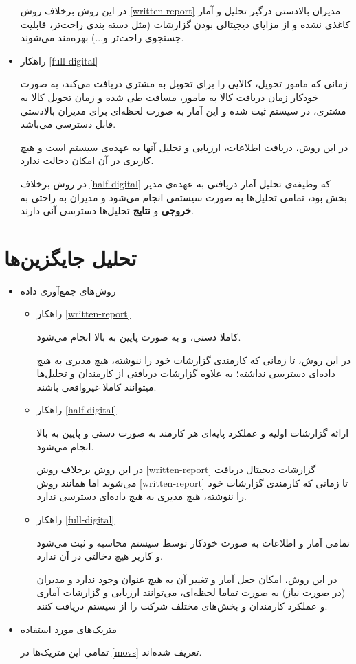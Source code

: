 \documentclass[12pt]{article}
\begin{document}
\begin{itemize}
    در این روش برخلاف روش \ref{written-report} مدیران بالادستی درگیر تحلیل و آمار کاغذی نشده و از مزایای دیجیتالی بودن گزارشات (مثل دسته بندی راحت‌تر، قابلیت جستجو‌ی راحت‌تر و...) بهره‌مند می‌شوند.
    \item راهکار \ref{full-digital}
    
    زمانی که مامور تحویل، کالایی را برای تحویل به مشتری دریافت می‌کند، به صورت خودکار زمان دریافت کالا به مامور، مسافت طی شده و زمان تحویل کالا به مشتری، در سیستم ثبت شده و این آمار به صورت لحظه‌‌ای برای مدیران بالادستی قابل دسترسی می‌باشد.
    
    در این روش، دریافت اطلاعات، ارزیابی و تحلیل آنها به عهده‌ی سیستم است و هیچ کاربری در آن امکان دخالت ندارد. 
    
    در روش برخلاف \ref{half-digital} که وظیفه‌ی تحلیل آمار دریافتی به عهده‌ی مدیر بخش بود، تمامی تحلیل‌ها به صورت سیستمی انجام می‌شود و مدیران به راحتی به \textbf{خروجی} و \textbf{نتایج} تحلیل‌ها دسترسی آنی دارند.
    
\end{itemize}

\section{تحلیل جایگزین‌ها}


\begin{itemize}
\item         
روش‌های جمع‌آوری داده

\begin{itemize}
    \item راهکار \ref{written-report} 
    
    کاملا دستی، و به صورت پایین به بالا انجام می‌شود.
  
  در این روش، تا زمانی که کارمندی گزارشات خود را ننوشته، هیچ مدیری به هیچ داده‌ای دسترسی نداشته؛ به علاوه گزارشات دریافتی از کارمندان و تحلیل‌ها میتوانند کاملا غیرواقعی‌ باشند.
    \item راهکار \ref{half-digital}
    
    ارائه گزارشات اولیه و عملکرد پایه‌ای هر کارمند به صورت دستی و پایین به بالا انجام می‌شود.
    
    در این روش برخلاف روش \ref{written-report} گزارشات دیجیتال دریافت می‌شوند اما همانند روش \ref{written-report} تا زمانی که کارمندی گزارشات خود را ننوشته، هیچ مدیری به هیچ داده‌ای دسترسی ندارد.
    
    \item راهکار \ref{full-digital}
    
    تمامی آمار و اطلاعات به صورت خودکار توسط سیستم محاسبه و ثبت می‌شود و کاربر هیچ دخالتی در آن ندارد.
    
    در این روش، امکان جعل آمار و تغییر آن به هیچ عنوان وجود ندارد و مدیران (در صورت نیاز) به صورت تماما لحظه‌ای، می‌توانند ارزیابی و گزارشات آماری و عملکرد کارمندان و بخش‌های مختلف شرکت را از سیستم دریافت کنند.
\end{itemize}
\item         
متریک‌های مورد استفاده

تمامی این متریک‌ها در \ref{movs} تعریف شده‌اند.
\end{itemize}
\end{document}
